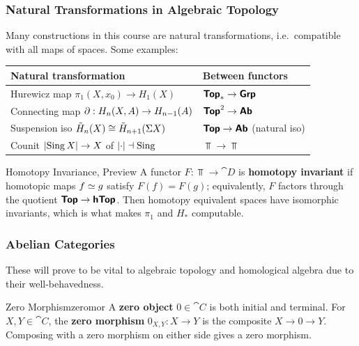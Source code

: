\subsubsection{Natural Transformations in Algebraic Topology}

Many constructions in this course are natural transformations, i.e.\ compatible with all maps of spaces. Some examples:

\begin{center}
\renewcommand{\arraystretch}{1.3}
\setlength{\aboverulesep}{0pt}\setlength{\belowrulesep}{0pt}
\begin{tabular}{ll}
\toprule
\rowcolor{tableHead}\textbf{Natural transformation} & \textbf{Between functors} \\
\midrule
Hurewicz map $\pi_1(X,x_0)\to H_1(X)$ & $\bm{\mathsf{Top}}_*\to\bm{\mathsf{Grp}}$ \\
Connecting map $\partial:H_n(X,A)\to H_{n-1}(A)$ & $\bm{\mathsf{Top}}^{2}\to\bm{\mathsf{Ab}}$ \\
Suspension iso $\tilde H_n(X)\cong\tilde H_{n+1}(\Sigma X)$ & $\bm{\mathsf{Top}}\to\bm{\mathsf{Ab}}$ (natural iso) \\
Counit $\lvert\operatorname{Sing} X\rvert\to X$ of $\lvert\cdot\rvert\dashv\operatorname{Sing}$ & $\Top\to\Top$ \\
\bottomrule
\end{tabular}
\end{center}

\begin{remark}{Homotopy Invariance, Preview}{}
    A functor $F:\Top\to\cat{D}$ is \textbf{homotopy invariant} if homotopic maps $f\simeq g$ satisfy $F(f)=F(g)$; equivalently, $F$ factors through the quotient $\bm{\mathsf{Top}}\to\bm{\mathsf{hTop}}$. Then homotopy equivalent spaces have isomorphic invariants, which is what makes $\pi_1$ and $H_*$ computable.
\end{remark}

\newpage

\subsubsection{Abelian Categories}

These will prove to be vital to algebraic topology and homological algebra due to their well-behavedness.

\begin{definition}{Zero Morphism}{zeromor}
    A \textbf{zero object} $0\in\cat{C}$ is both initial and terminal. For $X,Y\in\cat{C}$, the \textbf{zero morphism} $0_{X,Y}:X\to Y$ is the composite $X\to0\to Y$. Composing with a zero morphism on either side gives a zero morphism.
\end{definition}


